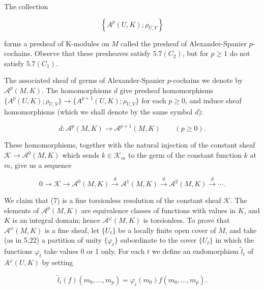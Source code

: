 The collection

\begin{equation}
\tag{5}\label{eq:5.26:5}
\left\{A^{p}(U,K);\rho_{U,V}\right\}
\end{equation}

forms a presheaf of K-modules on $M$ called the presheaf of Alexander-Spanier $p$-cochains. Observe that these presheaves satisfy $5.7(C_{2})$, but for $p\geq1$ do not satisfy $5.7(C_{1})$.

The associated sheaf of germs of Alexander-Spanier $p$-cochains we denote by $\mathcal{A}^{p}(M,K)$. The homomorphisms $d$ give presheaf homomorphisms $\{A^{p}(U,K);\rho_{U,V}\}\to\{A^{p+1}(U,K);\rho_{U,V}\}$ for each $p\geq0$, and induce sheaf homomorphisms (which we shall denote by the same symbol $d$):

\begin{equation}
\tag{6}\label{eq:5.26:6}
d\colon\mathcal{A}^{p}(M,K)\to\mathcal{A}^{p+1}(M,K)\qquad(p\geq0).
\end{equation}

These homomorphisms, together with the natural injection of the constant sheaf $\mathcal{K} \to \mathcal{A}^0(M,K)$ which sends $k \in \mathcal{K}_m$ to the germ of the constant function $k$ at $m$, give us a sequence

\begin{equation}
\tag{7}\label{eq:5.26:7}
0\to\mathcal{K}\to\mathcal{A}^{0}(M,K)\xrightarrow{d}\mathcal{A}^{1}(M,K)\xrightarrow{d}\mathcal{A}^{2}(M,K)\xrightarrow{d}\cdots.
\end{equation}

We claim that (7) is a fine torsionless resolution of the constant sheaf  $ \mathcal{K} $. The elements of $\mathcal{A}^{p}(M,K)$ are equivalence classes of functions with values in  $ K $, and  $ K $ is an integral domain; hence  $ \mathcal{A}^{\varphi}(M,K) $ is torsionless. To prove that  $ \mathcal{A}^{\varphi}(M,K) $ is a fine sheaf, let  $ \{U_t\} $ be a locally finite open cover of  $ M $, and take (as in 5.22) a partition of unity  $ \{\varphi_t\} $ subordinate to the cover  $ \{U_t\} $ in which the functions  $ \varphi_t $ take values 0 or 1 only. For each  $ t $ we define an endomorphism  $ \tilde{l}_t $ of  $ A^{\varphi}(U,K) $ by setting

\begin{equation}
\tag{8}\label{eq:5.26:8}
\tilde{l}_{i}(f)(m_{0},\ldots,m_{p})=\varphi_{i}(m_{0})f(m_{0},\ldots,m_{p}).
\end{equation}

